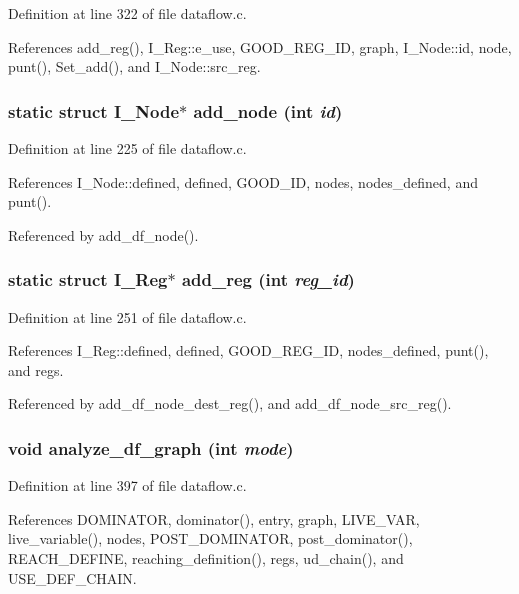 Definition at line 322 of file dataflow.c.

References add\_\-reg(), I\_\-Reg::e\_\-use, GOOD\_\-REG\_\-ID, graph, I\_\-Node::id, node, punt(), Set\_\-add(), and I\_\-Node::src\_\-reg.
\subsubsection{\setlength{\rightskip}{0pt plus 5cm}static struct \bf{I\_\-Node}$\ast$ add\_\-node (int {\em id})\hspace{0.3cm}{\tt  [static]}}\label{dataflow_8c_e7dc2f79b7804a22f68c6b4342c4c8a0}




Definition at line 225 of file dataflow.c.

References I\_\-Node::defined, defined, GOOD\_\-ID, nodes, nodes\_\-defined, and punt().

Referenced by add\_\-df\_\-node().
\subsubsection{\setlength{\rightskip}{0pt plus 5cm}static struct \bf{I\_\-Reg}$\ast$ add\_\-reg (int {\em reg\_\-id})\hspace{0.3cm}{\tt  [static]}}\label{dataflow_8c_b7acaf92f239588a7fd1e42514f6a882}




Definition at line 251 of file dataflow.c.

References I\_\-Reg::defined, defined, GOOD\_\-REG\_\-ID, nodes\_\-defined, punt(), and regs.

Referenced by add\_\-df\_\-node\_\-dest\_\-reg(), and add\_\-df\_\-node\_\-src\_\-reg().
\subsubsection{\setlength{\rightskip}{0pt plus 5cm}void analyze\_\-df\_\-graph (int {\em mode})}\label{dataflow_8c_35fcc36d70bd4a3e5bf901b0141aabea}




Definition at line 397 of file dataflow.c.

References DOMINATOR, dominator(), entry, graph, LIVE\_\-VAR, live\_\-variable(), nodes, POST\_\-DOMINATOR, post\_\-dominator(), REACH\_\-DEFINE, reaching\_\-definition(), regs, ud\_\-chain(), and USE\_\-DEF\_\-CHAIN.
